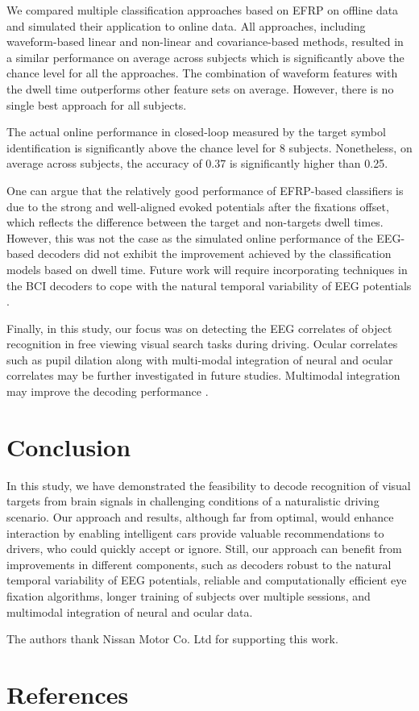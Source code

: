 \documentclass[12pt]{iopart}
\begin{document}

We compared multiple classification approaches based on EFRP on offline data and 
simulated their application to online data.
All approaches, including waveform-based linear and non-linear and covariance-based 
methods, resulted in a similar performance on average across subjects
which is significantly above the chance level for all the approaches.
The combination of waveform features with the dwell time outperforms
other feature sets on average.
However, there is no single best approach for all subjects.

The actual online performance in closed-loop measured by the target symbol identification
is significantly above the chance level for 8 subjects.
Nonetheless, on average across subjects, the accuracy of 0.37 is 
significantly higher than 0.25.

One can argue that the relatively good performance of EFRP-based classifiers is
due to the strong and well-aligned evoked potentials after the fixations offset,
which reflects the difference between the target and non-targets dwell times.
However, this was not the case as the simulated online
performance of the EEG-based decoders did not exhibit 
the improvement achieved by the classification models based on
dwell time. 
Future work will require 
incorporating techniques in the BCI decoders to cope
with the natural temporal variability of EEG potentials 
\cite{aydarkhanov_spatial_2020}.

Finally, in this study, our focus was on detecting the EEG correlates of object recognition in free viewing visual search tasks during driving. Ocular correlates such as pupil dilation along with multi-modal
integration of neural and ocular correlates may be further investigated
in future studies.
Multimodal integration may improve the decoding performance \cite{jangraw_neurally_2014}.


\section{Conclusion}
\label{sec:conclusion}

In this study, we have demonstrated the feasibility to decode 
recognition of visual targets from brain signals in
challenging conditions of a naturalistic driving scenario.
Our approach and results, although far from optimal, would
enhance interaction by enabling intelligent cars provide 
valuable recommendations to drivers, who could quickly accept
or ignore. Still, our approach can benefit from improvements
in different components, such as decoders robust to the
natural temporal variability of EEG potentials, reliable
and computationally efficient eye fixation algorithms, longer
training of subjects over multiple sessions, and multimodal 
integration of neural and ocular data.

\ack

The authors thank Nissan Motor Co. Ltd for supporting
this work.

\section*{References}



\end{document}
